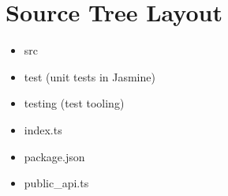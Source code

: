 \section{Source Tree Layout}


\begin{itemize}
  \item src
  \item test (unit tests in Jasmine)
  \item testing (test tooling)
\end{itemize}


\begin{itemize}
  \item index.ts
  \item package.json
  \item public\_api.ts
\end{itemize}




